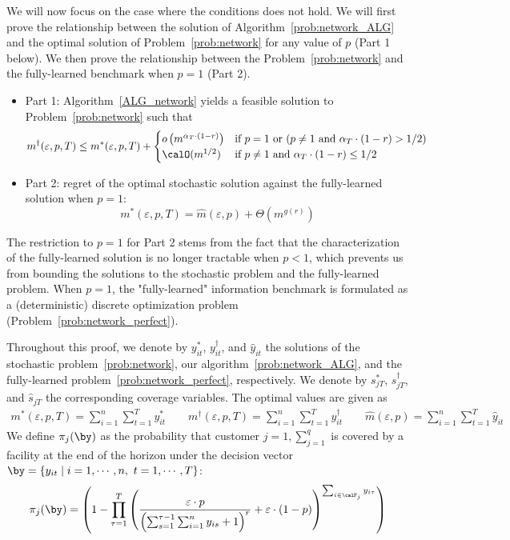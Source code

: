 \documentclass[blindrev]{informs3noheader}
\begin{document}
We will now focus on the case where the conditions does not hold. We will first prove the relationship between the solution of Algorithm~\eqref{prob:network_ALG} and the optimal solution of Problem~\eqref{prob:network} for any value of $p$ (Part 1 below). We then prove the relationship between the Problem~\eqref{prob:network} and the fully-learned benchmark when $p=1$ (Part 2).
\begin{itemize}
\item[--]  Part 1: Algorithm~\ref{ALG_network} yields a feasible solution to Problem~\eqref{prob:network} such that
$$m^\dagger(\varepsilon, p,T)\leq m^*(\varepsilon, p,T)+\begin{cases}
o\left(m^{\alpha_T \cdot (1-r)}\right)& \text{if }p=1 \text{ or } (p \neq 1 \text{ and } \alpha_T\cdot(1-r)>1/2)\\
\calO(m^{1/2}) & \text{if }p \neq 1\text{ and } \alpha_T\cdot(1-r)\leq 1/2        
\end{cases}$$
\item[--] Part 2: regret of the optimal stochastic solution against the fully-learned solution when $p=1$:
\[m^*(\varepsilon, p,T) = \widehat{m}(\varepsilon,p)+\Theta\left(m^{g(r)}\right)\]
\end{itemize}

The restriction to $p=1$ for Part 2 stems from the fact that the characterization of the fully-learned solution is no longer tractable when $p<1$, which prevents us from bounding the solutions to the stochastic problem and the fully-learned problem. When $p=1$, the "fully-learned" information benchmark is formulated as a (deterministic) discrete optimization problem (Problem~\eqref{prob:network_perfect}).

Throughout this proof, we denote by $y^*_{it}$, $y^\dagger_{it}$, and $\widehat{y}_{it}$ the solutions of the stochastic problem~\eqref{prob:network}, our algorithm~\eqref{prob:network_ALG}, and the fully-learned problem~\eqref{prob:network_perfect}, respectively. We denote by $s^*_{jT}$, $s^\dagger_{jT}$, and $\widehat{s}_{jT}$ the corresponding coverage variables. The optimal values are given as
\begin{align*}
m^*(\varepsilon, p,T)=\sum_{i=1}^n \sum_{t=1}^T y^*_{it}\qquad
m^\dagger(\varepsilon, p,T)=\sum_{i=1}^n \sum_{t=1}^T y^\dagger_{it}\qquad
\widehat{m}(\varepsilon,p)=\sum_{i=1}^n \sum_{t=1}^T \widehat{y}_{it}
\end{align*}
We define $\pi_{j}(\by)$ as the probability that customer $j=1,\sum_{j=1}^q$ is covered by a facility at the end of the horizon under the decision vector $\by=\{y_{it}\mid i=1,\cdots,n,\ t=1,\cdots,T\}$:
\begin{equation*}
\pi_{j}(\by)=\left(1-\prod_{\tau=1}^T \left(\frac{\varepsilon\cdot p}{\left(\sum_{s=1}^{\tau-1} \sum_{i=1}^n y_{is} +1\right)^r}+\varepsilon\cdot(1-p)\right)^{\sum_{i \in \calF_j} y_{i\tau}}\right)
\end{equation*}
\end{document}
